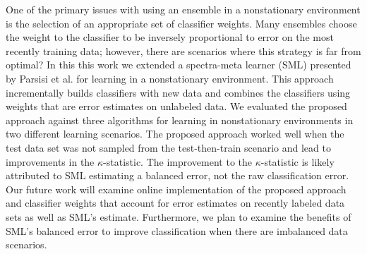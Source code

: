 \documentclass[10pt, conference]{IEEEtran}
\begin{document}
One of the primary issues with using an ensemble in a nonstationary environment is the selection of an appropriate set of classifier weights. Many ensembles choose the weight to the classifier to be inversely proportional to error on the most recently training data; however, there are scenarios where this strategy is far from optimal?  In this this work we extended a spectra-meta learner (SML) presented by Parsisi et al. for learning in a nonstationary environment. This approach incrementally builds classifiers with new data and combines the classifiers using weights that are error estimates on unlabeled data. We evaluated the proposed approach against three algorithms for learning in  nonstationary environments in two different learning scenarios. The proposed approach worked well when the test data set was not sampled from the test-then-train scenario and lead to improvements in the $\kappa$-statistic. The improvement to the $\kappa$-statistic is likely attributed to SML estimating a balanced error, not the raw classification error.  Our future work will examine online implementation of the proposed approach and classifier weights that account for error estimates on recently labeled data sets as well as SML's estimate. Furthermore, we plan to examine the benefits of SML's balanced error to improve classification when there are imbalanced data scenarios.
\end{document}
